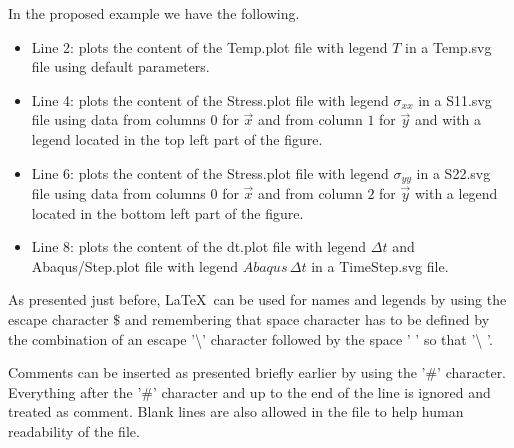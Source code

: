 In the proposed example we have the following.
\begin{itemize}
\item Line 2: plots the content of the Temp.plot file with legend $T$ in
a Temp.svg file using default parameters.
\item Line 4: plots the content of the Stress.plot file with legend $\sigma_{xx}$
in a S11.svg file using data from columns $0$ for $\overrightarrow{x}$
and from column $1$ for $\overrightarrow{y}$ and with a legend located
in the top left part of the figure.
\item Line 6: plots the content of the Stress.plot file with legend $\sigma_{yy}$
in a S22.svg file using data from columns $0$ for $\overrightarrow{x}$
and from column $2$ for $\overrightarrow{y}$ with a legend located
in the bottom left part of the figure.
\item Line 8: plots the content of the dt.plot file with legend $\Delta t$
and Abaqus/Step.plot file with legend $Abaqus\,\Delta t$ in a TimeStep.svg
file.
\end{itemize}
As presented just before, \LaTeX~can be used for names and legends
by using the escape character $\$$ and remembering that space character
has to be defined by the combination of an escape '\textbackslash '
character followed by the space ' ' so that '\textbackslash{} '.

Comments can be inserted as presented briefly earlier by using the
'\#' character. Everything after the '\#' character and up to the
end of the line is ignored and treated as comment. Blank lines are
also allowed in the file to help human readability of the file.

